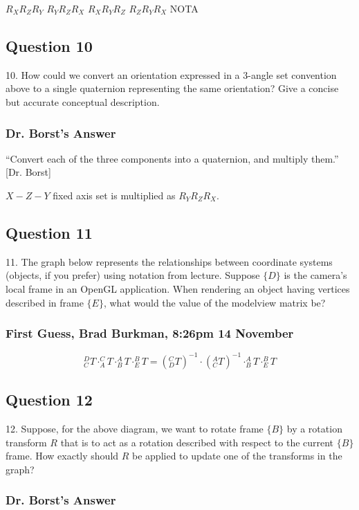 \documentclass[11pt]{article}
\begin{document}
\begin{spacing}{1.2}
\begin{enumerate}[label=\arabic*)]
	$R_XR_ZR_Y$ \qquad
	$R_YR_ZR_X$ \qquad
	$R_XR_YR_Z$ \qquad
	$R_ZR_YR_X$ \qquad
	NOTA
\end{enumerate}

\subsection{Question 10}
10.  How could we convert an orientation expressed in a 3-angle set convention above to a single quaternion representing the same orientation?  Give a concise but accurate conceptual description.

\subsubsection{Dr. Borst's Answer}

``Convert each of the three components into a quaternion, and multiply them.'' [Dr. Borst]

$X-Z-Y$ fixed axis set is multiplied as $R_YR_ZR_X$.


\subsection{Question 11}
11.  The graph below represents the relationships between coordinate systems (objects, if you prefer) using notation from lecture.  Suppose $\{D\}$ is the camera's local frame in an OpenGL application.  When rendering an object having vertices described in frame $\{E\}$, what would the value of the modelview matrix be?

\subsubsection{First Guess, Brad Burkman, 8:26pm 14 November}

$$
	^D_CT \cdot 
	^C_AT \cdot 
	^A_BT \cdot 
	^B_ET = 
	\left( ^C_DT \right)^{-1} \cdot
	\left( ^A_CT \right)^{-1} \cdot
	^A_BT \cdot 
	^B_ET
	$$
	
\subsection{Question 12}
12.  Suppose, for the above diagram, we want to rotate frame $\{B\}$ by a rotation transform $R$ that is to act as a rotation described with respect to the  current $\{B\}$ frame.  How exactly should $R$ be applied to update one of the transforms in the graph?

\subsubsection{Dr. Borst's Answer}


\end{spacing}
\end{document}
